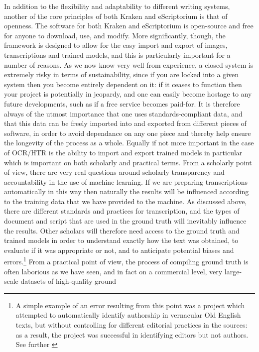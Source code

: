 In addition to the flexibility and adaptability to different writing systems,
another of the core principles of both Kraken and eScriptorium is that of
openness. The software for both Kraken and eScriptorium is open-source and free
for anyone to download, use, and modify. More significantly, though, the
framework is designed to allow for the easy import and export of images,
transcriptions and trained models, and this is particularly important for a
number of reasons. As we now know very well from experience, a closed system is
extremely risky in terms of sustainability, since if you are locked into a
given system then you become entirely dependent on it: if it ceases to function
then your project is potentially in jeopardy, and one can easily become hostage
to any future developments, such as if a free service becomes paid-for. It is
therefore always of the utmost importance that one uses standards-compliant
data, and that this data can be freely imported into and exported from
different pieces of software, in order to avoid dependance on any one piece and
thereby help ensure the longevity of the process as a whole. Equally if not
more important in the case of OCR/HTR is the ability to import and export
trained models in particular which is important on both scholarly and practical
terms. From a scholarly point of view, there are very real questions around
scholarly transparency and accountability in the use of machine learning. If we
are preparing transcriptions automatically in this way then naturally the
results will be influenced according to the training data that we have provided
to the machine. As discussed above, there are different standards and practices
for transcription, and the types of document and script that are used in the
ground truth will inevitably influence the results. Other scholars will
therefore need access to the ground truth and trained models in order to
understand exactly how the text was obtained, to evaluate if it was appropriate
or not, and to anticipate potential biases and errors.\footnote{A simple
example of an error resulting from this point was a project which attempted to
automatically identify authorship in vernacular Old English texts, but without
controlling for different editorial practices in the sources: as a result, the
project was successful in identifying editors but not authors. See further
\cite[pg. 54-56]{stokes2009digital}} From a practical point of view, the
process of compiling ground truth is often laborious as we have seen, and in
fact on a commercial level, very large-scale datasets of high-quality ground
